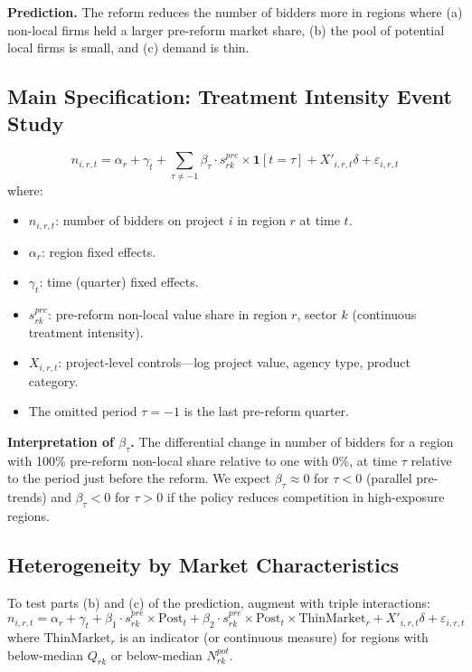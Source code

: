 \documentclass[12pt]{article}
\newcommand{\ind}{\mathbf{1}}
\begin{document}
\textbf{Prediction.} The reform reduces the number of bidders more in regions where (a) non-local firms held a larger pre-reform market share, (b) the pool of potential local firms is small, and (c) demand is thin.

\subsection{Main Specification: Treatment Intensity Event Study}

\begin{equation}\label{eq:es_competition}
    n_{i,r,t} = \alpha_r + \gamma_t + \sum_{\tau \neq -1} \beta_\tau \cdot s_{rk}^{pre} \times \ind[t = \tau] + X'_{i,r,t}\delta + \varepsilon_{i,r,t}
\end{equation}
where:
\begin{itemize}[itemsep=2pt]
    \item $n_{i,r,t}$: number of bidders on project $i$ in region $r$ at time $t$.
    \item $\alpha_r$: region fixed effects.
    \item $\gamma_t$: time (quarter) fixed effects.
    \item $s_{rk}^{pre}$: pre-reform non-local value share in region $r$, sector $k$ (continuous treatment intensity).
    \item $X_{i,r,t}$: project-level controls---log project value, agency type, product category.
    \item The omitted period $\tau = -1$ is the last pre-reform quarter.
\end{itemize}

\textbf{Interpretation of $\beta_\tau$.} The differential change in number of bidders for a region with 100\% pre-reform non-local share relative to one with 0\%, at time $\tau$ relative to the period just before the reform. We expect $\beta_\tau \approx 0$ for $\tau < 0$ (parallel pre-trends) and $\beta_\tau < 0$ for $\tau > 0$ if the policy reduces competition in high-exposure regions.

\subsection{Heterogeneity by Market Characteristics}

To test parts (b) and (c) of the prediction, augment with triple interactions:
\begin{equation}\label{eq:triple_thin}
    n_{i,r,t} = \alpha_r + \gamma_t + \beta_1 \cdot s_{rk}^{pre} \times \text{Post}_t + \beta_2 \cdot s_{rk}^{pre} \times \text{Post}_t \times \text{ThinMarket}_r + X'_{i,r,t}\delta + \varepsilon_{i,r,t}
\end{equation}
where $\text{ThinMarket}_r$ is an indicator (or continuous measure) for regions with below-median $Q_{rk}$ or below-median $N_{rk}^{pot}$.
\end{document}
